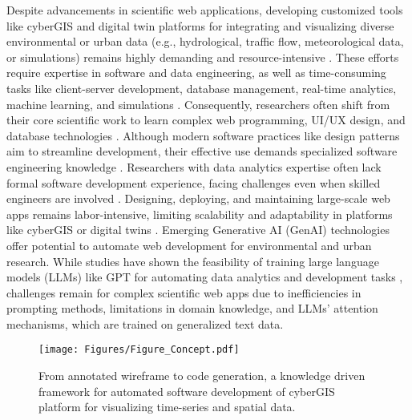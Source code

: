 Despite advancements in scientific web applications, developing customized tools like cyberGIS and digital twin platforms for integrating and visualizing diverse environmental or urban data (e.g., hydrological, traffic flow, meteorological data, or simulations) remains highly demanding and resource-intensive \citep{shanjun2024design, siddiqui2024digital, lei2023challenges}. These efforts require expertise in software and data engineering, as well as time-consuming tasks like client-server development, database management, real-time analytics, machine learning, and simulations \citep{ikegwu2022big}. Consequently, researchers often shift from their core scientific work to learn complex web programming, UI/UX design, and database technologies \citep{li2022bibliometric}. Although modern software practices like design patterns aim to streamline development, their effective use demands specialized software engineering knowledge \citep{fayad2015software}. Researchers with data analytics expertise often lack formal software development experience, facing challenges even when skilled engineers are involved \citep{kim2017data}. Designing, deploying, and maintaining large-scale web apps remains labor-intensive, limiting scalability and adaptability in platforms like cyberGIS or digital twins \citep{shah2024optimizing, mcbreen2002software, liu2015cybergis}. Emerging Generative AI (GenAI) technologies offer potential to automate web development for environmental and urban research. While studies have shown the feasibility of training large language models (LLMs) like GPT for automating data analytics and development tasks \citep{liang2024can, liukko2024chatgpt}, challenges remain for complex scientific web apps due to inefficiencies in prompting methods, limitations in domain knowledge, and LLMs' attention mechanisms, which are trained on generalized text data.

\begin{figure*}[htb]
 \centering
\texttt{[image: Figures/Figure\_Concept.pdf]}
 \caption{From annotated wireframe to code generation, a knowledge driven framework for automated software development of cyberGIS platform for visualizing time-series and spatial data. }
 \label{fig:concepts}
\end{figure*}

